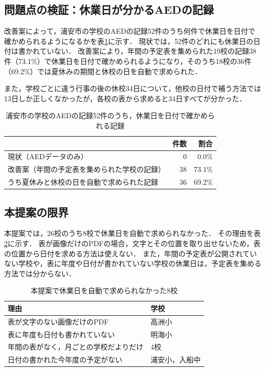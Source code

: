 \documentclass[a4paper,12pt,oneside]{jex}
\begin{document}
\subsection{問題点の検証：休業日が分かるAEDの記録}
\label{subsec:v_social}

改善案によって，浦安市の学校のAEDの記録52件のうち何件で休業日を日付で確かめられるようになるかを表\ref{tab:social}に示す．
現状では，52件のどれにも休業日の日付は書かれていない．
改善案により，年間の予定表を集められた19校の記録38件（73.1\%）で休業日を日付で確かめられるようになり，そのうち18校の36件（69.2\%）では夏休みの期間と休校の日を自動で求められた．

また，学校ごとに違う行事の後の休校34日について，他校の日付で補う方法では13日しか正しくなかったが，各校の表から求めると34日すべてが分かった．

\begin{table}[htbp]
\centering
\caption{浦安市の学校のAEDの記録52件のうち，休業日を日付で確かめられる記録}
\label{tab:social}
\begin{tabular}{lrr}
\toprule
& 件数 & 割合 \\
\midrule
現状（AEDデータのみ） & 0 & 0.0\% \\
改善案（年間の予定表を集められた学校の記録） & 38 & 73.1\% \\
\quad うち夏休みと休校の日を自動で求められた記録 & 36 & 69.2\% \\
\bottomrule
\end{tabular}
\end{table}

\subsection{本提案の限界}
\label{subsec:remain}

本提案では，26校のうち8校で休業日を自動で求められなかった．
その理由を表\ref{tab:remain}に示す．
表が画像だけのPDFの場合，文字とその位置を取り出せないため，表の位置から日付を求める方法は使えない．
また，年間の予定表が公開されていない学校や，表に年度や日付が書かれていない学校の休業日は，予定表を集める方法では分からない．

\begin{table}[htbp]
\centering
\caption{本提案で休業日を自動で求められなかった8校}
\label{tab:remain}
\begin{tabular}{ll}
\toprule
理由 & 学校 \\
\midrule
表が文字のない画像だけのPDF & 高洲小 \\
表に年度も日付も書かれていない & 明海小 \\
年間の表がなく，月ごとの学校だよりだけ & 4校 \\
日付の書かれた今年度の予定がない & 浦安小，入船中 \\
\bottomrule
\end{tabular}
\end{table}
\end{document}
